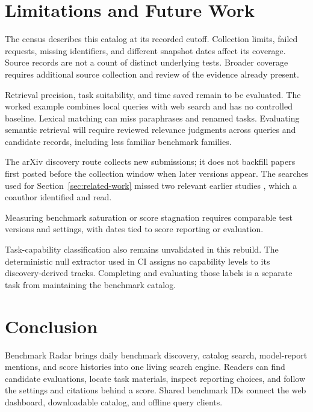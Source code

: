 \documentclass[11pt]{article}
\newcommand{\ReportNumber}[1]{\pgfmathprintnumber[fixed,precision=0,1000 sep={,},assume math mode=true]{#1}}
\begin{document}
\section{Limitations and Future Work}
\label{sec:caveat-future-work}

The census describes this catalog at its recorded cutoff. Collection limits, failed requests, missing identifiers, and different snapshot dates affect its coverage. Source records are not a count of distinct underlying tests. Broader coverage requires additional source collection and review of the evidence already present.

Retrieval precision, task suitability, and time saved remain to be evaluated. The worked example combines local queries with web search and has no controlled baseline. Lexical matching can miss paraphrases and renamed tasks. Evaluating semantic retrieval \citep{reimers2019sentencebert} will require reviewed relevance judgments across queries and candidate records, including less familiar benchmark families.

The arXiv discovery route collects new submissions; it does not backfill papers first posted before the collection window when later versions appear. The searches used for Section~\ref{sec:related-work} missed two relevant earlier studies \citep{yang2026benchmark,akhtar2026plateau}, which a coauthor identified and read.

Measuring benchmark saturation or score stagnation requires comparable test versions and settings, with dates tied to score reporting or evaluation.

Task-capability classification also remains unvalidated in this rebuild. The deterministic null extractor used in CI assigns no capability levels to its \ReportNumber{\CensusUnclassified} discovery-derived tracks. Completing and evaluating those labels is a separate task from maintaining the benchmark catalog.

\section{Conclusion}

Benchmark Radar brings daily benchmark discovery, catalog search, model-report mentions, and score histories into one living search engine. Readers can find candidate evaluations, locate task materials, inspect reporting choices, and follow the settings and citations behind a score. Shared benchmark IDs connect the web dashboard, downloadable catalog, and offline query clients.
\end{document}
